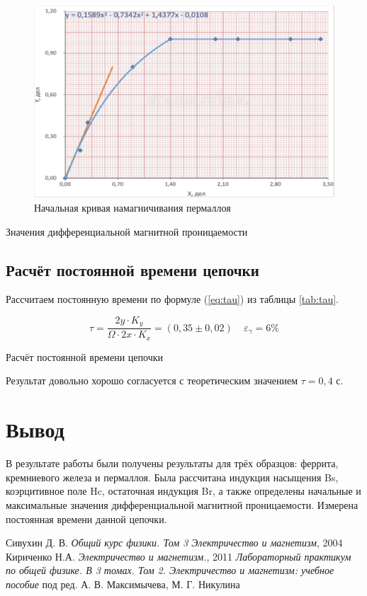 \documentclass[12pt,a4paper]{article}
\begin{document}
\begin{figure}[h!]
	\centering
	\includegraphics[width = 12 cm]{src/perm.png}
	\caption{Начальная кривая намагничивания пермаллоя}
\end{figure}

\begin{table}[H]
    \caption{Значения дифференциальной магнитной проницаемости}
    
	\label{tab:mu}
\end{table}

\subsection*{Расчёт постоянной времени цепочки}

Рассчитаем постоянную времени по формуле (\ref{eq:tau}) из таблицы \ref{tab:tau}.

$$\tau = \frac{2y\cdot K_y}{\Omega \cdot 2x\cdot K_x } = (0,35 \pm 0,02) \;\;\;\; \varepsilon_{\gamma}=6\%$$

\begin{table}[H]
    \caption{Расчёт постоянной времени цепочки}
    \centering
    
	\label{tab:tau}
\end{table}


Результат довольно хорошо согласуется с теоретическим значением $\tau = 0,4$ с.

\section*{Вывод}

В результате работы были получены результаты для трёх образцов: феррита, кремниевого железа и пермаллоя. Была рассчитана индукция насыщения Bs, коэрцитивное поле Hc, остаточная индукция Br, а также определены начальные и максимальные значения дифференциальной магнитной проницаемости. Измерена постоянная времени данной цепочки.

\newpage
\begin{thebibliography}{9}
	 Сивухин Д. В. \emph{Общий курс физики. Том 3 Электричество и магнетизм}, 2004
	 Кириченко Н.А. \emph{Электричество и магнетизм.}, 2011
	 \emph{Лабораторный практикум по общей физике. В 3 томах. Том 2. Электричество и магнетизм: учебное пособие} под ред. А. В. Максимычева, М. Г. Никулина
\end{thebibliography}
\end{document}
